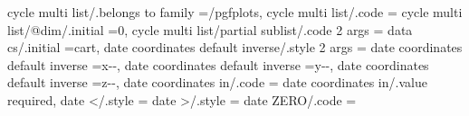 {{{{{{{{{{{{{{{{{{cycle multi list/.belongs to family                                =/pgfplots,                                                                                                                         
cycle multi list/.code                                             ={%
cycle multi list/@dim/.initial                                     =0,                                                                                                                                 
cycle multi list/partial sublist/.code 2 args                      ={%
data cs/.initial                                                   =cart,%
date coordinates default inverse/.style 2 args                     ={%
date coordinates default inverse                                   ={x}{\year-\month-\day},                                                                                                            
date coordinates default inverse                                   ={y}{\year-\month-\day},                                                                                                            
date coordinates default inverse                                   ={z}{\year-\month-\day},                                                                                                            
date coordinates in/.code                                          ={%
date coordinates in/.value required,
date </.style                                                      ={%
date >/.style                                                      ={%
date ZERO/.code                                                    ={%
}}}}}}}}}}}}}}}}}}}}}}}}}
